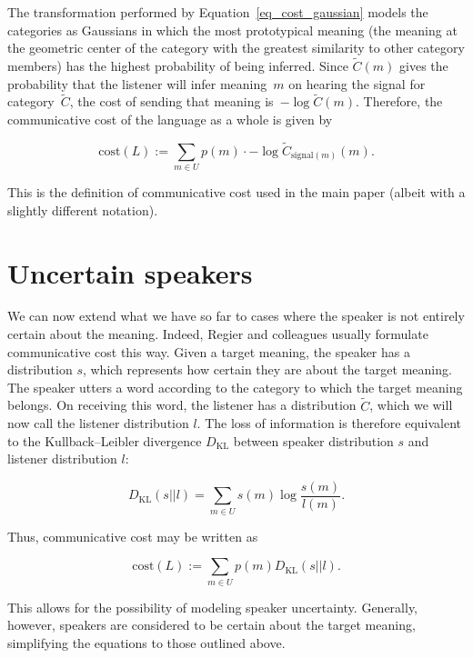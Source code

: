 \documentclass[a4paper, 11pt]{article}
\begin{document}
The transformation performed by Equation~\ref{eq_cost_gaussian} models the categories as Gaussians in which the most prototypical meaning (the meaning at the geometric center of the category with the greatest similarity to other category members) has the highest probability of being inferred. Since $\tilde{C}(m)$ gives the probability that the listener will infer meaning~$m$ on hearing the signal for category~$\tilde{C}$, the cost of sending that meaning is~$-\log \tilde{C}(m)$. Therefore, the communicative cost of the language as a whole is given by

	\begin{equation}
	\mathrm{cost}(L) := \sum_{m\in U} p(m) \cdot -\log \tilde{C}_{\mathrm{signal}(m)}(m).
	\label{eq_cost_continuous}
	\end{equation}

\noindent
This is the definition of communicative cost used in the main paper (albeit with a slightly different notation).

\section{Uncertain speakers}

We can now extend what we have so far to cases where the speaker is not entirely certain about the meaning. Indeed, Regier and colleagues usually formulate communicative cost this way. Given a target meaning, the speaker has a distribution $s$, which represents how certain they are about the target meaning. The speaker utters a word according to the category to which the target meaning belongs. On receiving this word, the listener has a distribution $\tilde{C}$, which we will now call the listener distribution $l$. The loss of information is therefore equivalent to the Kullback--Leibler divergence $D_\mathrm{KL}$ between speaker distribution $s$ and listener distribution $l$:

	\begin{equation}
	D_\mathrm{KL}(s||l) = \sum_{m \in U} s(m) \log \frac{s(m)}{l(m)}.
	\label{eq_kullback_leibler}
	\end{equation}

\noindent
Thus, communicative cost may be written as

	\begin{equation}
	\mathrm{cost}(L) := \sum_{m\in U} p(m) D_\mathrm{KL}(s||l).
	\label{eq_cost_kullback}
	\end{equation}

\noindent
This allows for the possibility of modeling speaker uncertainty. Generally, however, speakers are considered to be certain about the target meaning, simplifying the equations to those outlined above.
\end{document}
